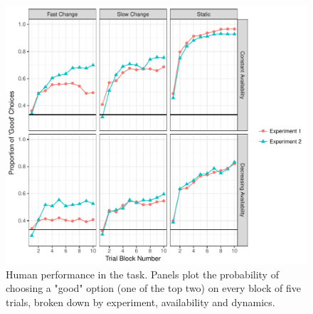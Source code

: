 \documentclass[a4paper,doc,natbib]{apa6}
\begin{document}
\begin{figure}[t]
\centering
\includegraphics[width=.9\textwidth]{humanperformance.pdf}
\caption{\small{Human performance in the task. Panels plot the probability of choosing a "good" option (one of the top two) on every block of five trials, broken down by experiment, availability and dynamics.}}
\label{fig:goodchoices_human}
\end{figure}
\end{document}
